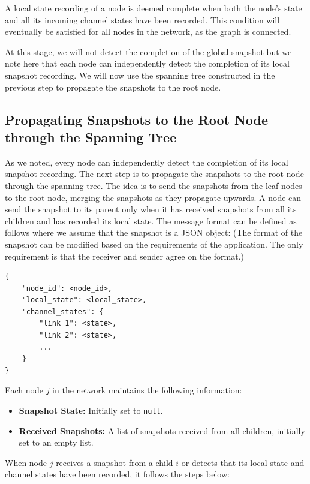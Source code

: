 A local state recording of a node is deemed complete when both the node's state and all its incoming channel states have been recorded. This condition will eventually be satisfied for all nodes in the network, as the graph is connected. 

At this stage, we will not detect the completion of the global snapshot but we note here that each node can independently detect the completion of its local snapshot recording. We will now use the spanning tree constructed in the previous step to propagate the snapshots to the root node.

\subsection{Propagating Snapshots to the Root Node through the Spanning Tree}
As we noted, every node can independently detect the completion of its local snapshot recording. The next step is to propagate the snapshots to the root node through the spanning tree. The idea is to send the snapshots from the leaf nodes to the root node, merging the snapshots as they propagate upwards. A node can send the snapshot to its parent only when it has received snapshots from all its children and has recorded its local state. The message format can be defined as follows where we assume that the snapshot is a JSON object: (The format of the snapshot can be modified based on the requirements of the application. The only requirement is that the receiver and sender agree on the format.)

\begin{verbatim}
{
    "node_id": <node_id>,
    "local_state": <local_state>,
    "channel_states": {
        "link_1": <state>,
        "link_2": <state>,
        ...
    }
}
\end{verbatim}

Each node \(j\) in the network maintains the following information:
\begin{itemize}
    \item \textbf{Snapshot State:} Initially set to \texttt{null}.
    \item \textbf{Received Snapshots:} A list of snapshots received from all children, initially set to an empty list.
\end{itemize}

When node \(j\) receives a snapshot from a child \(i\) or detects that its local state and channel states have been recorded, it follows the steps below:

